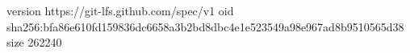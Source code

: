 version https://git-lfs.github.com/spec/v1
oid sha256:bfa86e610fd159836dc6658a3b2bd8dbc4e1e523549a98e967ad8b9510565d38
size 262240

